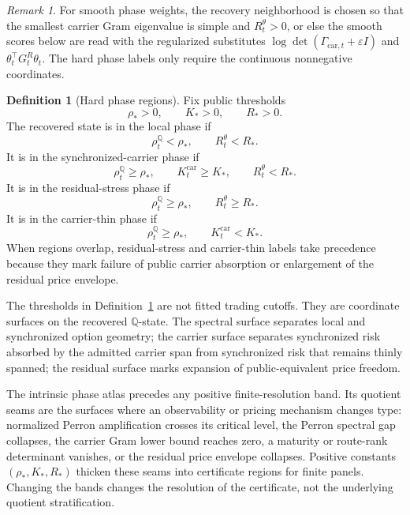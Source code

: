 \documentclass[11pt,a4paper]{amsart}
\theoremstyle{plain}
\theoremstyle{definition}
\newtheorem{definition}[theorem]{Definition}
\theoremstyle{remark}
\newtheorem{remark}[theorem]{Remark}
\newcommand{\QQ}{\mathbb{Q}}
\newcommand{\eps}{\varepsilon}
\begin{document}
\begin{remark}
For smooth phase weights, the recovery neighborhood is chosen so that the smallest carrier Gram
eigenvalue is simple and \(R_t^\theta>0\), or else the smooth scores below are read with the
regularized substitutes \(\log\det(\Gamma_{\mathrm{car},t}+\eps I)\) and
\(\theta_t^\top G_t^R\theta_t\).  The hard phase labels only require the continuous
nonnegative coordinates.
\end{remark}

\begin{definition}[Hard phase regions]\label{def:hard-phases}
Fix public thresholds
\[
        \rho_*>0,\qquad K_*>0,\qquad R_*>0.
\]
The recovered state is in the local phase if
\[
        \rho_t^\QQ<\rho_*,
        \qquad
        R_t^\theta<R_*.
\]
It is in the synchronized-carrier phase if
\[
        \rho_t^\QQ\ge\rho_*,
        \qquad
        K_t^{\mathrm{car}}\ge K_*,
        \qquad
        R_t^\theta<R_*.
\]
It is in the residual-stress phase if
\[
        \rho_t^\QQ\ge\rho_*,
        \qquad
        R_t^\theta\ge R_*.
\]
It is in the carrier-thin phase if
\[
        \rho_t^\QQ\ge\rho_*,
        \qquad
        K_t^{\mathrm{car}}<K_*.
\]
When regions overlap, residual-stress and carrier-thin labels take precedence because they mark
failure of public carrier absorption or enlargement of the residual price envelope.
\end{definition}

The thresholds in Definition~\ref{def:hard-phases} are not fitted trading cutoffs.  They are
coordinate surfaces on the recovered \(\QQ\)-state.  The spectral surface separates local and
synchronized option geometry; the carrier surface separates synchronized risk absorbed by the
admitted carrier span from synchronized risk that remains thinly spanned; the residual surface
marks expansion of public-equivalent price freedom.

The intrinsic phase atlas precedes any positive finite-resolution band.  Its quotient seams are the
surfaces where an observability or pricing mechanism changes type: normalized Perron amplification
crosses its critical level, the Perron spectral gap collapses, the carrier Gram lower bound reaches
zero, a maturity or route-rank determinant vanishes, or the residual price envelope collapses.
Positive constants \((\rho_*,K_*,R_*)\) thicken these seams into certificate regions for finite
panels.  Changing the bands changes the resolution of the certificate, not the underlying quotient
stratification.
\end{document}
